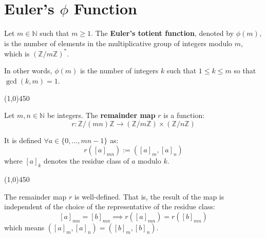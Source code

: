 \section{Euler's \texorpdfstring{$\phi$}{phi} Function}
\begin{definition}
    Let $m \in \mathbb{N}$ such that $m \ge 1$. The \textbf{Euler's totient function}, denoted by $\phi(m)$, is the number of elements in the multiplicative group of integers modulo $m$, which is $\left(\mathbb{Z}/m\mathbb{Z}\right)^*$.
    
    In other words, $\phi(m)$ is the number of integers $k$ such that $1 \le k \le m$ so that $\gcd(k, m) = 1$.
\end{definition}

\begin{center}
    \vspace{10pt}
    \line(1,0){450}
    \vspace{25pt}
\end{center}

\begin{definition}
    Let $m, n \in \mathbb{N}$ be integers. The \textbf{remainder map} $r$ is a function:
    $$r: \mathbb{Z}/(mn)\mathbb{Z} \longrightarrow (\mathbb{Z}/m\mathbb{Z}) \times (\mathbb{Z}/n\mathbb{Z})$$
    
    It is defined $\forall a \in \{0, \dots, mn - 1\}$ as:
    $$r([a]_{mn}) := ([a]_m, [a]_n)$$
    where $[a]_k$ denotes the residue class of $a$ modulo $k$.
\end{definition}

\begin{center}
    \vspace{10pt}
    \line(1,0){450}
    \vspace{25pt}
\end{center}

\bigskip

\begin{proposition}
    The remainder map $r$ is well-defined. That is, the result of the map is independent of the choice of the representative of the residue class:
    $$[a]_{mn} = [b]_{mn} \implies r([a]_{mn}) = r([b]_{mn})$$
    which means $([a]_m, [a]_n) = ([b]_m, [b]_n)$.
\end{proposition}

